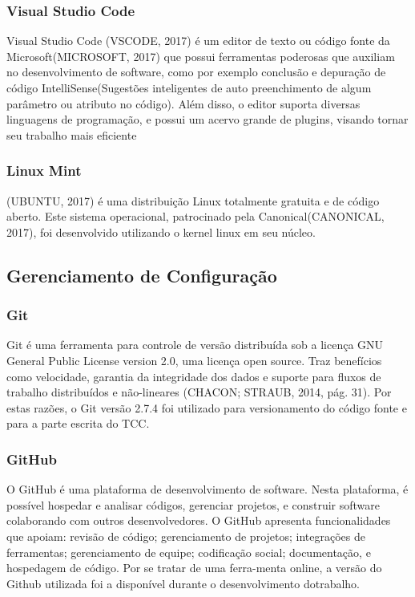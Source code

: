 \subsubsection{Visual Studio Code}

Visual Studio Code (VSCODE, 2017) é um editor de texto ou código fonte da Microsoft(MICROSOFT, 2017) que possui ferramentas poderosas que auxiliam no desenvolvimento de software, como por exemplo conclusão e depuração de código IntelliSense(Sugestões inteligentes de auto preenchimento de algum parâmetro ou atributo no código). Além disso, o editor suporta diversas linguagens de programação, e possui um acervo grande de plugins, visando tornar seu trabalho mais eficiente

\subsubsection{Linux Mint}
(UBUNTU, 2017) é uma distribuição Linux totalmente gratuita e de código aberto. Este sistema operacional, patrocinado pela Canonical(CANONICAL, 2017), foi desenvolvido utilizando o kernel linux em seu núcleo.

\subsection{Gerenciamento de Configuração}

\subsubsection{Git}
Git é uma ferramenta para controle de versão distribuída sob a licença GNU General Public License version 2.0, uma licença open source. Traz benefícios como velocidade, garantia da integridade dos dados e suporte para fluxos de trabalho distribuídos e não-lineares (CHACON; STRAUB, 2014, pág. 31). Por estas razões, o Git versão 2.7.4 foi utilizado para versionamento do código fonte e para a parte escrita do TCC.

\subsubsection{GitHub}

O GitHub é uma plataforma de desenvolvimento de software. Nesta plataforma, é possível hospedar e analisar códigos, gerenciar projetos, e construir software colaborando com outros desenvolvedores. O GitHub apresenta funcionalidades que apoiam: revisão de código; gerenciamento de projetos; integrações de ferramentas; gerenciamento de equipe; codificação social; documentação, e hospedagem de código. Por se tratar de uma ferra-menta online, a versão do Github utilizada foi a disponível durante o desenvolvimento dotrabalho.


